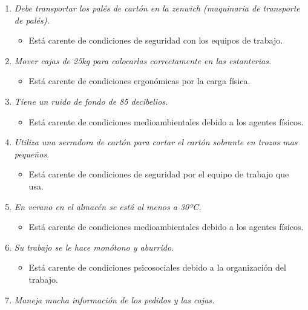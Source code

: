 \documentclass{article}
\begin{document}
        \begin{enumerate}[label=(\alph*)]
          \item \textit{Debe transportar los palés de cartón en la zenwich (maquinaria de transporte de palés).}
            \begin{itemize}
              \item Está carente de condiciones de seguridad con los equipos de trabajo.
            \end{itemize}
          \item \textit{Mover cajas de 25kg para colocarlas correctamente en las estanterias.}
            \begin{itemize}
              \item Está carente de condiciones ergonómicas por la carga física.
            \end{itemize}
          \item \textit{Tiene un ruido de fondo de 85 decibelios.}
            \begin{itemize}
              \item Está carente de condiciones medioambientales debido a los agentes físicos.
            \end{itemize}
          \item \textit{Utiliza una serradora de cartón para cortar el cartón sobrante en trozos mas pequeños.}
            \begin{itemize}
              \item Está carente de condiciones de seguridad por el equipo de trabajo que usa.
            \end{itemize}
          \item \textit{En verano en el almacén se está al menos a 30ºC.}
            \begin{itemize}
              \item Está carente de condiciones medioambientales debido a los agentes físicos.
            \end{itemize}
          \item \textit{Su trabajo se le hace monótono y aburrido.}
            \begin{itemize}
              \item Está carente de condiciones psicosociales debido a la organización del trabajo.
            \end{itemize}
          \item \textit{Maneja mucha información de los pedidos y las cajas.}
            \begin{itemize}

\end{itemize}
\end{enumerate}
\end{document}
